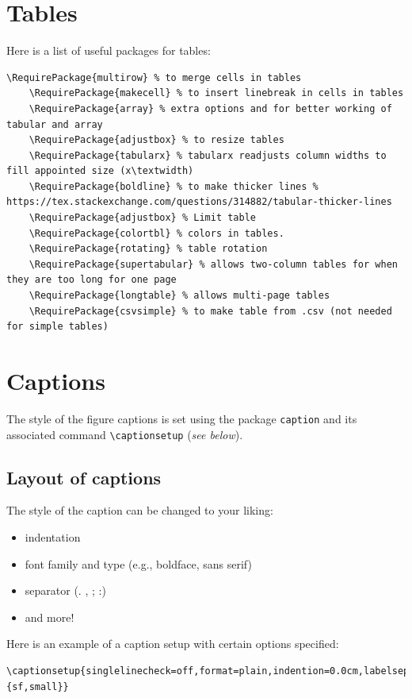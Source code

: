\documentclass[main_brownies.tex]{subfiles}
\begin{document}
\section{Tables}
Here is a list of useful packages for tables:
\begin{Verbatim}[breaklines=true]
	\RequirePackage{multirow} % to merge cells in tables
	\RequirePackage{makecell} % to insert linebreak in cells in tables
	\RequirePackage{array} % extra options and for better working of tabular and array
	\RequirePackage{adjustbox} % to resize tables
	\RequirePackage{tabularx} % tabularx readjusts column widths to fill appointed size (x\textwidth)
	\RequirePackage{boldline} % to make thicker lines % https://tex.stackexchange.com/questions/314882/tabular-thicker-lines
	\RequirePackage{adjustbox} % Limit table
	\RequirePackage{colortbl} % colors in tables.
	\RequirePackage{rotating} % table rotation
	\RequirePackage{supertabular} % allows two-column tables for when they are too long for one page
	\RequirePackage{longtable} % allows multi-page tables
	\RequirePackage{csvsimple} % to make table from .csv (not needed for simple tables)
\end{Verbatim}

\section{Captions}
The style of the figure captions is set using the package \verb*|caption| and its associated command \verb*|\captionsetup| (\emph{see below}).

\subsection{Layout of captions}
The style of the caption can be changed to your liking:
\begin{itemize}
	\item indentation
	\item font family and type (e.g., boldface, sans serif)
	\item separator (. , ; :)
	\item and more!
\end{itemize}

Here is an example of a caption setup with certain options specified:
\begin{Verbatim}[breaklines=true, breakanywhere=true]
	\captionsetup{singlelinecheck=off,format=plain,indention=0.0cm,labelsep=colon,labelfont=bf,font={sf,small}}
\end{Verbatim}
\end{document}

